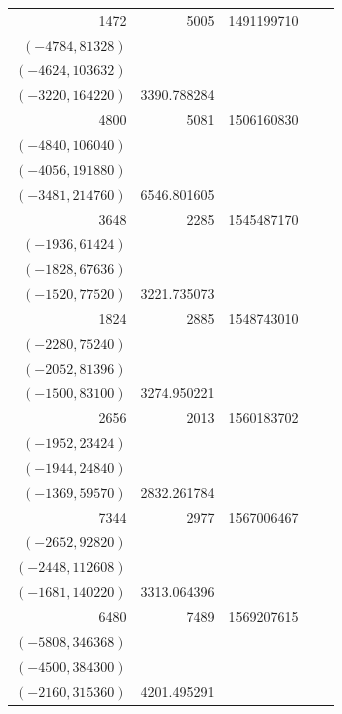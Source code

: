 \documentclass[11pt]{article}
\begin{document}
\begin{longtable}{r r r l r}
1472 & 5005 & 1491199710 & \begin{tabular}[t]{@{}l@{}}$(-4928,49280)$\\$(-4784,81328)$\\$(-4624,103632)$\\$(-3220,164220)$\end{tabular} & 3390.788284\\[5pt]
4800 & 5081 & 1506160830 & \begin{tabular}[t]{@{}l@{}}$(-5000,63000)$\\$(-4840,106040)$\\$(-4056,191880)$\\$(-3481,214760)$\end{tabular} & 6546.801605\\[5pt]
3648 & 2285 & 1545487170 & \begin{tabular}[t]{@{}l@{}}$(-2160,39600)$\\$(-1936,61424)$\\$(-1828,67636)$\\$(-1520,77520)$\end{tabular} & 3221.735073\\[5pt]
1824 & 2885 & 1548743010 & \begin{tabular}[t]{@{}l@{}}$(-2401,70070)$\\$(-2280,75240)$\\$(-2052,81396)$\\$(-1500,83100)$\end{tabular} & 3274.950221\\[5pt]
2656 & 2013 & 1560183702 & \begin{tabular}[t]{@{}l@{}}$(-1992,13944)$\\$(-1952,23424)$\\$(-1944,24840)$\\$(-1369,59570)$\end{tabular} & 2832.261784\\[5pt]
7344 & 2977 & 1567006467 & \begin{tabular}[t]{@{}l@{}}$(-2748,79692)$\\$(-2652,92820)$\\$(-2448,112608)$\\$(-1681,140220)$\end{tabular} & 3313.064396\\[5pt]
6480 & 7489 & 1569207615 & \begin{tabular}[t]{@{}l@{}}$(-7260,151140)$\\$(-5808,346368)$\\$(-4500,384300)$\\$(-2160,315360)$\end{tabular} & 4201.495291\\[5pt]

\end{longtable}
\end{document}
